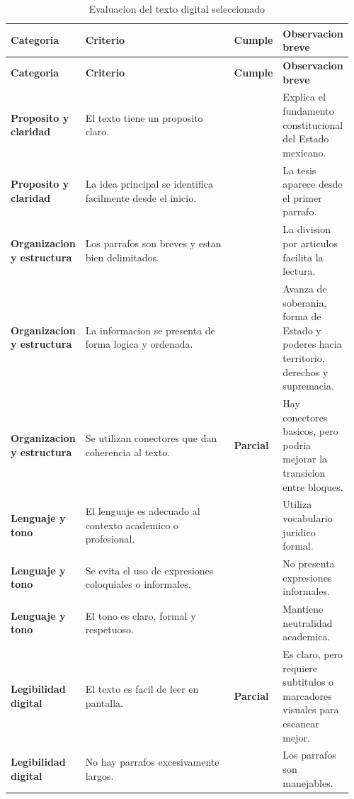 \documentclass[12pt,letterpaper,oneside]{article}
\newcommand{\checkyes}{\textbf{\checkmark}}
\newcommand{\checkpartial}{\textbf{Parcial}}
\begin{document}
\begingroup
\small
\setlength{\tabcolsep}{5pt}
\renewcommand{\arraystretch}{1.35}
\begin{longtable}{@{}p{0.19\linewidth}p{0.49\linewidth}p{0.10\linewidth}p{0.18\linewidth}@{}}
\caption{Evaluacion del texto digital seleccionado}\label{tab:lista-verificacion}\\
\toprule
\textbf{Categoria} & \textbf{Criterio} & \textbf{Cumple} & \textbf{Observacion breve} \\
\midrule
\endfirsthead
\toprule
\textbf{Categoria} & \textbf{Criterio} & \textbf{Cumple} & \textbf{Observacion breve} \\
\midrule
\endhead
\bottomrule
\endlastfoot

\textbf{Proposito y claridad} & El texto tiene un proposito claro. & \checkyes & Explica el fundamento constitucional del Estado mexicano. \\
\midrule
\textbf{Proposito y claridad} & La idea principal se identifica facilmente desde el inicio. & \checkyes & La tesis aparece desde el primer parrafo. \\
\midrule
\textbf{Organizacion y estructura} & Los parrafos son breves y estan bien delimitados. & \checkyes & La division por articulos facilita la lectura. \\
\midrule
\textbf{Organizacion y estructura} & La informacion se presenta de forma logica y ordenada. & \checkyes & Avanza de soberania, forma de Estado y poderes hacia territorio, derechos y supremacia. \\
\midrule
\textbf{Organizacion y estructura} & Se utilizan conectores que dan coherencia al texto. & \checkpartial & Hay conectores basicos, pero podria mejorar la transicion entre bloques. \\
\midrule
\textbf{Lenguaje y tono} & El lenguaje es adecuado al contexto academico o profesional. & \checkyes & Utiliza vocabulario juridico formal. \\
\midrule
\textbf{Lenguaje y tono} & Se evita el uso de expresiones coloquiales o informales. & \checkyes & No presenta expresiones informales. \\
\midrule
\textbf{Lenguaje y tono} & El tono es claro, formal y respetuoso. & \checkyes & Mantiene neutralidad academica. \\
\midrule
\textbf{Legibilidad digital} & El texto es facil de leer en pantalla. & \checkpartial & Es claro, pero requiere subtitulos o marcadores visuales para escanear mejor. \\
\midrule
\textbf{Legibilidad digital} & No hay parrafos excesivamente largos. & \checkyes & Los parrafos son manejables. \\

\end{longtable}
\end{document}
